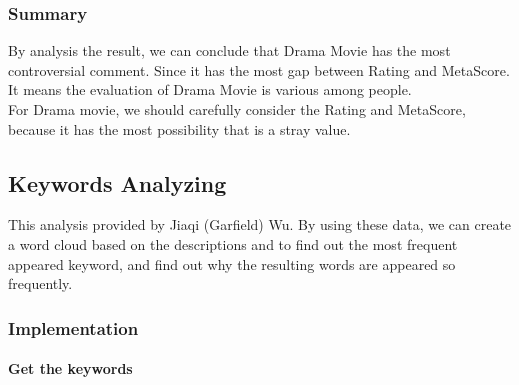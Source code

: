 \documentclass[11pt]{article}
\begin{document}
    \subsubsection{Summary}\label{summary}

By analysis the result, we can conclude that Drama Movie has the most
controversial comment. Since it has the most gap between Rating and
MetaScore. It means the evaluation of Drama Movie is various among
people.
\\
For Drama movie, we should carefully consider the Rating and MetaScore,
because it has the most possibility that is a stray value.

    \subsection{Keywords Analyzing}\label{keywords-analyzing}

This analysis provided by Jiaqi (Garfield) Wu. By using these data, we
can create a word cloud based on the descriptions and to find out the
most frequent appeared keyword, and find out why the resulting words are
appeared so frequently.

\subsubsection{Implementation}\label{implementation}

\paragraph{Get the keywords}\label{get-the-keywords}
\end{document}
